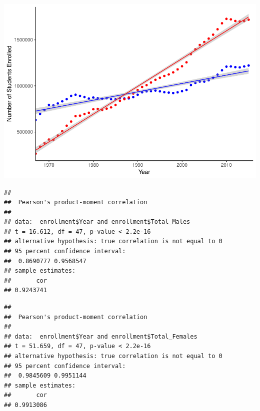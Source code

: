 \documentclass[]{article}
\newenvironment{Shaded}{\begin{snugshade}}{\end{snugshade}}
\newcommand{\KeywordTok}[1]{\textcolor[rgb]{0.13,0.29,0.53}{\textbf{#1}}}
\newcommand{\StringTok}[1]{\textcolor[rgb]{0.31,0.60,0.02}{#1}}
\newcommand{\CommentTok}[1]{\textcolor[rgb]{0.56,0.35,0.01}{\textit{#1}}}
\newcommand{\OperatorTok}[1]{\textcolor[rgb]{0.81,0.36,0.00}{\textbf{#1}}}
\newcommand{\NormalTok}[1]{#1}
\begin{document}
\includegraphics{Assignment_5_Markdown_files/figure-latex/unnamed-chunk-5-1.pdf}

\begin{Shaded}
\end{Shaded}

\begin{verbatim}
## 
##  Pearson's product-moment correlation
## 
## data:  enrollment$Year and enrollment$Total_Males
## t = 16.612, df = 47, p-value < 2.2e-16
## alternative hypothesis: true correlation is not equal to 0
## 95 percent confidence interval:
##  0.8690777 0.9568547
## sample estimates:
##       cor 
## 0.9243741
\end{verbatim}

\begin{Shaded}
\end{Shaded}

\begin{verbatim}
## 
##  Pearson's product-moment correlation
## 
## data:  enrollment$Year and enrollment$Total_Females
## t = 51.659, df = 47, p-value < 2.2e-16
## alternative hypothesis: true correlation is not equal to 0
## 95 percent confidence interval:
##  0.9845609 0.9951144
## sample estimates:
##       cor 
## 0.9913086
\end{verbatim}
\end{document}
